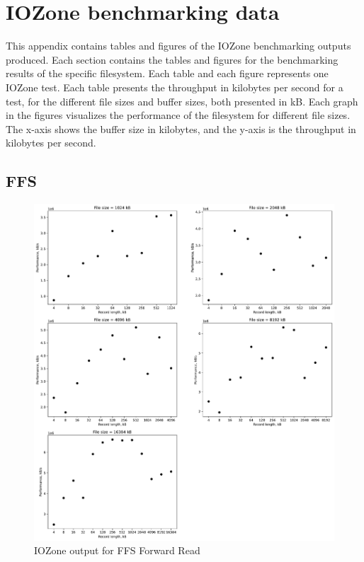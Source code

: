 \chapter{IOZone benchmarking data}
\label{app:bench_data}
This appendix contains tables and figures of the IOZone benchmarking outputs produced. Each section contains the tables and figures for the benchmarking results of the specific filesystem. Each table and each figure represents one IOZone test. Each table presents the throughput in kilobytes per second for a test, for the different file sizes and buffer sizes, both presented in kB. Each graph in the figures visualizes the performance of the filesystem for different file sizes. The x-axis shows the buffer size in kilobytes, and the y-axis is the throughput in kilobytes per second.

\section{FFS}








\begin{figure}[!htb]
	\label{fig:app_bench_ffs_read}
	\begin{center}
		\includegraphics[width=1.0\textwidth]{figures/benchmarking/ffs/Read.pdf}
	\end{center}
	\caption{IOZone output for \gls{FFS} Forward Read}
\end{figure}

